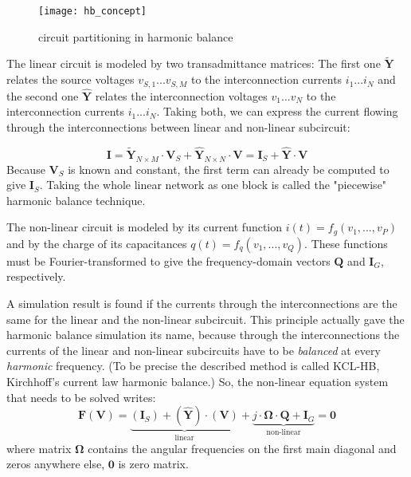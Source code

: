 \begin{figure}[ht]
\begin{center}
\texttt{[image: hb\_concept]}
\end{center}
\caption{circuit partitioning in harmonic balance}
\label{fig:hb_concept}
\end{figure}
\FloatBarrier

The linear circuit is modeled by two transadmittance matrices:
The first one $\tilde{\boldsymbol{Y}}$
relates the source voltages $v_{S,1}...v_{S,M}$ to the interconnection
currents $i_1...i_N$ and the second one $\hat{\boldsymbol{Y}}$
relates the interconnection
voltages $v_1...v_N$ to the interconnection currents $i_1...i_N$.
Taking both, we can express the current flowing through the
interconnections between linear and non-linear subcircuit:

\begin{equation}
\label{eqn:HBlin}
\boldsymbol{I}
  = \boldsymbol{\tilde{Y}}_{N\times M}\cdot \boldsymbol{V}_S +
    \boldsymbol{\hat{Y}}_{N\times N}\cdot \boldsymbol{V}
  = \boldsymbol{I}_S + \boldsymbol{\hat{Y}}\cdot \boldsymbol{V}
\end{equation}
Because $\boldsymbol{V}_S$ is known and constant, the first term
can already be computed to give $\boldsymbol{I}_S$. Taking the
whole linear network as one block is called the "piecewise"
harmonic balance technique.

\addvspace{12pt}

The non-linear circuit is modeled by its current function
$i(t) = f_g(v_1, ..., v_P)$
and by the charge of its capacitances
$q(t) = f_q(v_1, ..., v_Q)$.
These functions must be Fourier-transformed to give the
frequency-domain vectors $\boldsymbol{Q}$ and $\boldsymbol{I}_G$,
respectively.

\addvspace{12pt}

A simulation result is found if the currents through the
interconnections are the same for the linear and the non-linear
subcircuit. This principle actually gave the harmonic balance
simulation its name, because through the interconnections the
currents of the linear and non-linear subcircuits have to be
\textit{balanced} at every \textit{harmonic} frequency. (To
be precise the described method is called KCL-HB, Kirchhoff's
current law harmonic balance.) So, the non-linear equation
system that needs to be solved writes:
\begin{equation}
\label{eqn:HBeqn}
\textbf{F}(\textbf{V})
  = \underbrace{(\boldsymbol{I}_S) + (\boldsymbol{\hat{Y}})\cdot (\boldsymbol{V})}_{\text{linear}}
  + \underbrace{j\cdot \boldsymbol{\Omega}\cdot \boldsymbol{Q} + \boldsymbol{I}_G}_{\text{non-linear}}
  = \boldsymbol{0}
\end{equation}
where matrix $\boldsymbol{\Omega}$ contains the angular frequencies
on the first main diagonal and zeros anywhere else, $\boldsymbol{0}$
is zero matrix.

